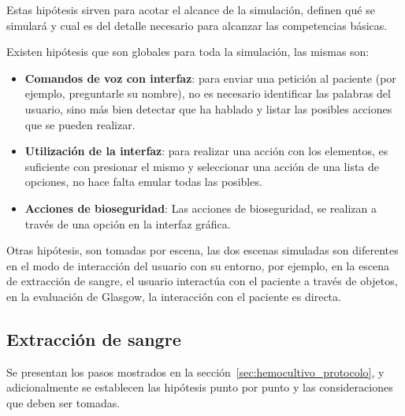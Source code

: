 Estas hipótesis sirven para acotar el alcance de la simulación, definen qué se
simulará y cual es del detalle necesario para alcanzar las competencias básicas.

Existen hipótesis que son globales para toda la simulación, las mismas son:

\begin{itemize}

    \item \textbf{Comandos de voz con interfaz}: para enviar una petición al
        paciente (por ejemplo, preguntarle su nombre), no es necesario
        identificar las palabras del usuario, sino más bien detectar que ha
        hablado y listar las posibles acciones que se pueden realizar.

    \item \textbf{Utilización de la interfaz}: para realizar una acción con los
        elementos, es suficiente con presionar el mismo y seleccionar una acción
        de una lista de opciones, no hace falta emular todas las posibles.

    \item \textbf{Acciones de bioseguridad}: Las
        acciones de bioseguridad, se realizan a través de una opción en la
        interfaz gráfica.

\end{itemize}

Otras hipótesis, son tomadas por escena, las dos escenas simuladas son
diferentes en el modo de interacción del usuario con su entorno, por ejemplo, en
la escena de extracción de sangre, el usuario interactúa con el paciente a
través de objetos, en la evaluación de Glasgow, la interacción con el paciente
es directa.

\subsection{Extracción de sangre}
\label{sec:hemocultivo_hipotesis}

Se presentan los pasos mostrados en la sección~\ref{sec:hemocultivo_protocolo},
y adicionalmente se establecen las hipótesis punto por punto y las
consideraciones que deben ser tomadas.

